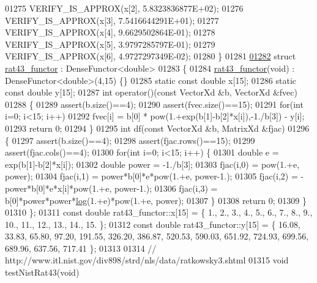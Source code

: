 \begin{DoxyCode}
01275   VERIFY\_IS\_APPROX(x[2], 5.8323836877E+02);
01276   VERIFY\_IS\_APPROX(x[3], 7.5416644291E+01);
01277   VERIFY\_IS\_APPROX(x[4], 9.6629502864E-01);
01278   VERIFY\_IS\_APPROX(x[5], 3.9797285797E-01);
01279   VERIFY\_IS\_APPROX(x[6], 4.9727297349E-02);
01280 \}
01281 
\hyperlink{structrat43__functor}{01282} \textcolor{keyword}{struct }\hyperlink{structrat43__functor}{rat43\_functor} : DenseFunctor<double>
01283 \{
01284     \hyperlink{structrat43__functor}{rat43\_functor}(\textcolor{keywordtype}{void}) : DenseFunctor<double>(4,15) \{\}
01285     \textcolor{keyword}{static} \textcolor{keyword}{const} \textcolor{keywordtype}{double} x[15];
01286     \textcolor{keyword}{static} \textcolor{keyword}{const} \textcolor{keywordtype}{double} y[15];
01287     \textcolor{keywordtype}{int} operator()(\textcolor{keyword}{const} VectorXd &b, VectorXd &fvec)
01288     \{
01289         assert(b.size()==4);
01290         assert(fvec.size()==15);
01291         \textcolor{keywordflow}{for}(\textcolor{keywordtype}{int} i=0; i<15; i++)
01292             fvec[i] = b[0] * pow(1.+exp(b[1]-b[2]*x[i]),-1./b[3]) - y[i];
01293         \textcolor{keywordflow}{return} 0;
01294     \}
01295     \textcolor{keywordtype}{int} df(\textcolor{keyword}{const} VectorXd &b, MatrixXd &fjac)
01296     \{
01297         assert(b.size()==4);
01298         assert(fjac.rows()==15);
01299         assert(fjac.cols()==4);
01300         \textcolor{keywordflow}{for}(\textcolor{keywordtype}{int} i=0; i<15; i++) \{
01301             \textcolor{keywordtype}{double} e = exp(b[1]-b[2]*x[i]);
01302             \textcolor{keywordtype}{double} power = -1./b[3];
01303             fjac(i,0) = pow(1.+e, power);
01304             fjac(i,1) = power*b[0]*e*pow(1.+e, power-1.);
01305             fjac(i,2) = -power*b[0]*e*x[i]*pow(1.+e, power-1.);
01306             fjac(i,3) = b[0]*power*power*\hyperlink{structlog}{log}(1.+e)*pow(1.+e, power);
01307         \}
01308         \textcolor{keywordflow}{return} 0;
01309     \}
01310 \};
01311 \textcolor{keyword}{const} \textcolor{keywordtype}{double} rat43\_functor::x[15] = \{ 1., 2., 3., 4., 5., 6., 7., 8., 9., 10., 11., 12., 13., 14., 15. \};
01312 \textcolor{keyword}{const} \textcolor{keywordtype}{double} rat43\_functor::y[15] = \{ 16.08, 33.83, 65.80, 97.20, 191.55, 326.20, 386.87, 520.53, 590.03, 
      651.92, 724.93, 699.56, 689.96, 637.56, 717.41 \};
01313 
01314 \textcolor{comment}{// http://www.itl.nist.gov/div898/strd/nls/data/ratkowsky3.shtml}
01315 \textcolor{keywordtype}{void} testNistRat43(\textcolor{keywordtype}{void})

\end{DoxyCode}
